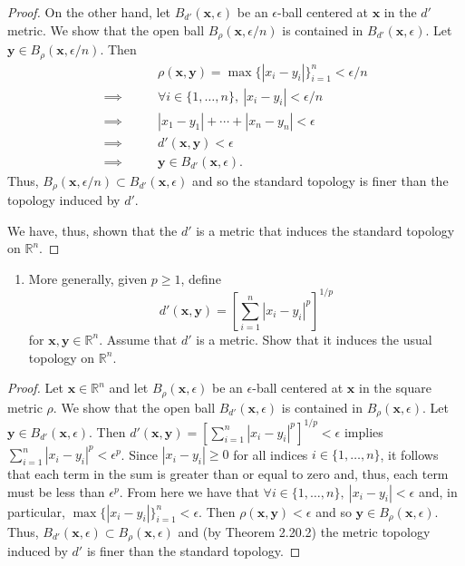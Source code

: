 \documentclass[a4paper,10pt]{article}
\newcommand{\bx}{\mathbf{x}}
\newcommand{\by}{\mathbf{y}}
\newcommand{\RR}{\mathbb{R}}
\begin{document}
\begin{solution}
\begin{proof}
        On the other hand, let $B_{d'}(\bx, \epsilon)$ be an $\epsilon$-ball centered at $\bx$ in the $d'$ metric.
        We show that the open ball $B_\rho(\bx, \epsilon/n)$ is contained in $B_{d'}(\bx, \epsilon)$.
        Let $\by \in B_\rho(\bx, \epsilon/n)$.
        Then
        \begin{align*}
                            & \rho(\bx, \by)  = \max\{|x_i - y_i|\}_{i=1}^n < \epsilon / n \\
            \implies\qquad  & \forall i \in \{1, \ldots, n\},~ |x_i - y_i| < \epsilon / n \\
            \implies\qquad  & |x_1 - y_1| + \cdots + |x_n - y_n| < \epsilon \\
            \implies\qquad  & d'(\bx, \by) < \epsilon \\
            \implies\qquad  & \by \in B_{d'}(\bx, \epsilon).
        \end{align*}
        Thus, $B_\rho(\bx, \epsilon / n) \subset B_{d'}(\bx, \epsilon)$ and so the standard topology is finer than the topology induced by $d'$.

        We have, thus, shown that the $d'$ is a metric that induces the standard topology on $\RR^n$.
    \end{proof}
    \bigskip

    \begin{enumerate}[label={(\alph*)}, align=left, leftmargin=\parindent, listparindent=\parindent, labelwidth=0pt, itemindent=!]
        \addtocounter{enumi}{1} 
         \item  More generally, given $p \geq 1$, define
         \begin{equation*}
             d'(\bx, \by) = \left[\sum_{i=1}^n |x_i - y_i|^p\right]^{1/p}
         \end{equation*}
         for $\bx, \by \in \RR^n$.
         Assume that $d'$ is a metric.
         Show that it induces the usual topology on $\RR^n$.
    \end{enumerate}
    \begin{proof}
        Let $\bx \in \RR^n$ and let $B_\rho(\bx, \epsilon)$ be an $\epsilon$-ball centered at $\bx$ in the square metric $\rho$.
        We show that the open ball $B_{d'}(\bx, \epsilon)$ is contained in $B_\rho(\bx, \epsilon)$.
        Let $\by \in B_{d'}(\bx, \epsilon)$.
        Then $d'(\bx, \by) = \left[\sum_{i=1}^n |x_i - y_i|^p\right]^{1/p} < \epsilon$ implies $\sum_{i=1}^n |x_i - y_i|^p < \epsilon^p$.
        Since $|x_i - y_i| \geq 0$ for all indices $i \in \{1, \ldots, n\}$, it follows that each term in the sum is greater than or equal to zero and, thus, each term must be less than $\epsilon^p$.
        From here we have that $\forall i \in \{1, \ldots, n\},~ |x_i - y_i| < \epsilon$ and, in particular, $\max \{|x_i - y_i|\}_{i=1}^n < \epsilon$. 
        Then $\rho(\bx, \by) < \epsilon$ and so $\by \in B_\rho(\bx, \epsilon)$.
        Thus, $B_{d'}(\bx, \epsilon) \subset B_\rho(\bx, \epsilon)$ and (by Theorem 2.20.2) the metric topology induced by $d'$ is finer than the standard topology.


\end{proof}
\end{solution}
\end{document}
